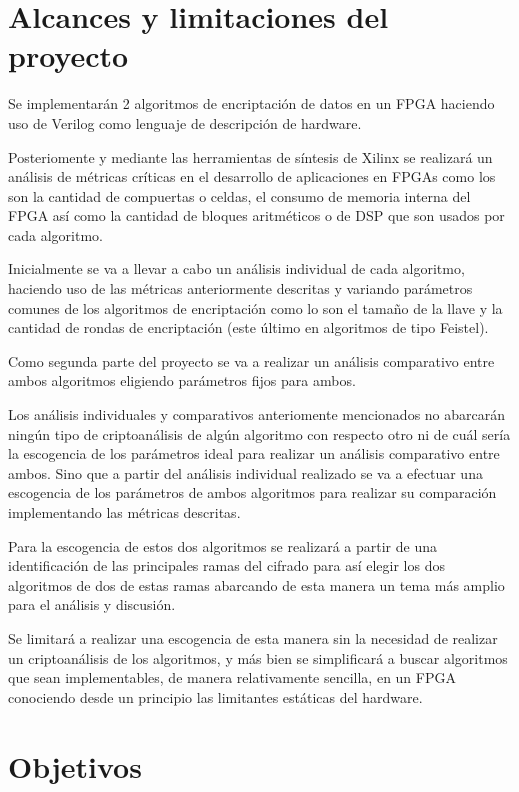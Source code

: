 \section{Alcances y limitaciones del proyecto}
Se implementarán 2 algoritmos de encriptación de datos en un FPGA haciendo uso de Verilog como lenguaje de descripción de hardware. 

Posteriomente y mediante las herramientas de síntesis de Xilinx se realizará un análisis de métricas críticas en el desarrollo de aplicaciones en FPGAs como los son la cantidad de compuertas o celdas, el consumo de memoria interna del FPGA así como la cantidad de bloques aritméticos o de DSP que son usados por cada algoritmo. 

Inicialmente se va a llevar a cabo un análisis individual de cada algoritmo, haciendo uso de las métricas anteriormente descritas y variando parámetros comunes de los algoritmos de encriptación como lo son el tamaño de la llave y la cantidad de rondas de encriptación (este último en algoritmos de tipo Feistel). 

Como segunda parte del proyecto se va a realizar un análisis comparativo entre ambos algoritmos eligiendo parámetros fijos para ambos.

Los análisis individuales y comparativos anteriomente mencionados no abarcarán ningún tipo de criptoanálisis de algún algoritmo con respecto otro ni de cuál sería la escogencia de los parámetros ideal para realizar un análisis comparativo entre ambos. Sino que a partir del análisis individual realizado se va a efectuar una escogencia de los parámetros de ambos algoritmos para realizar su comparación implementando las métricas descritas.

Para la escogencia de estos dos algoritmos se realizará a partir de una identificación de las principales ramas del cifrado para así elegir los dos algoritmos de dos de estas ramas abarcando de esta manera un tema más amplio para el análisis y discusión.

Se limitará a realizar una escogencia de esta manera sin la necesidad de realizar un criptoanálisis de los algoritmos, y más bien se simplificará a buscar algoritmos que sean implementables, de manera relativamente sencilla, en un FPGA conociendo desde un principio las limitantes estáticas del hardware.


\section{Objetivos}

